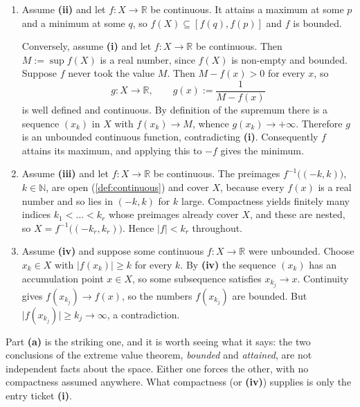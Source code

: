 \begin{exercisesolution}
\label{sol:pseudocompactness_implications}
\begin{enumerate}[label=\textbf{(\alph*)}]
  \item Assume \textbf{(ii)} and let $f : X \to \mathbb{R}$ be continuous. It attains a maximum
    at some $p$ and a minimum at some $q$, so $f(X) \subseteq [f(q),f(p)]$ and $f$ is bounded.

    Conversely, assume \textbf{(i)} and let $f : X \to \mathbb{R}$ be continuous. Then
    $M := \sup f(X)$ is a real number, since $f(X)$ is non-empty and bounded. Suppose $f$ never
    took the value $M$. Then $M - f(x) > 0$ for every $x$, so
    \[g : X \to \mathbb{R}, \qquad g(x) := \frac{1}{M-f(x)}\]
    is well defined and continuous. By definition of the supremum there is a sequence $(x_k)$ in
    $X$ with $f(x_k) \to M$, whence $g(x_k) \to +\infty$. Therefore $g$ is an unbounded continuous
    function, contradicting \textbf{(i)}. Consequently $f$ attains its maximum, and applying this
    to $-f$ gives the minimum.

  \item Assume \textbf{(iii)} and let $f : X \to \mathbb{R}$ be continuous. The preimages
    $f^{-1}\big((-k,k)\big)$, $k \in \mathbb{N}$, are open (\cref{def:continuous}) and cover $X$,
    because every $f(x)$ is a real number and so lies in $(-k,k)$ for $k$ large. Compactness
    yields finitely many indices $k_1 < \dots < k_r$ whose preimages already cover $X$, and these
    are nested, so $X = f^{-1}\big((-k_r,k_r)\big)$. Hence $\lvert f\rvert < k_r$ throughout.

  \item Assume \textbf{(iv)} and suppose some continuous $f : X \to \mathbb{R}$ were unbounded.
    Choose $x_k \in X$ with $\lvert f(x_k)\rvert \ge k$ for every $k$. By \textbf{(iv)} the
    sequence $(x_k)$ has an accumulation point $x \in X$, so some subsequence satisfies
    $x_{k_j} \to x$. Continuity gives $f(x_{k_j}) \to f(x)$, so the numbers $f(x_{k_j})$ are
    bounded. But $\lvert f(x_{k_j})\rvert \ge k_j \to \infty$, a contradiction.
\end{enumerate}
\begin{remark}
Part \textbf{(a)} is the striking one, and it is worth seeing what it says: the two conclusions of
the extreme value theorem, \emph{bounded} and \emph{attained}, are not independent facts about the
space. Either one forces the other, with no compactness assumed anywhere. What compactness (or
\textbf{(iv)}) supplies is only the entry ticket \textbf{(i)}.


\end{remark}
\end{exercisesolution}
